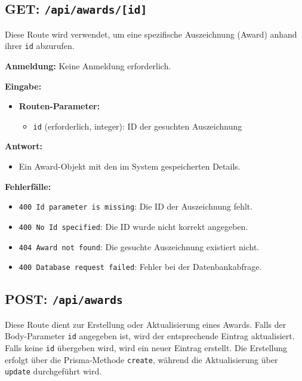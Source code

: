 \documentclass[a4paper,12pt]{article}
\begin{document}
\newpage
\subsection{GET: \texttt{/api/awards/[id]}}

Diese Route wird verwendet, um eine spezifische Auszeichnung (Award) anhand
ihrer \texttt{id} abzurufen.

\textbf{Anmeldung:} Keine Anmeldung erforderlich.

\textbf{Eingabe:}
\begin{itemize}
    \item \textbf{Routen-Parameter:}
    \begin{itemize}
        \item \texttt{id} (erforderlich, integer):
            ID der gesuchten Auszeichnung
    \end{itemize}
\end{itemize}

\textbf{Antwort:}
\begin{itemize}
    \item Ein Award-Objekt mit den im System gespeicherten Details.
\end{itemize}

\textbf{Fehlerfälle:}
\begin{itemize}
    \item \texttt{400 Id parameter is missing}:
        Die ID der Auszeichnung fehlt.
    \item \texttt{400 No Id specified}:
        Die ID wurde nicht korrekt angegeben.
    \item \texttt{404 Award not found}:
        Die gesuchte Auszeichnung existiert nicht.
    \item \texttt{400 Database request failed}:
        Fehler bei der Datenbankabfrage.
\end{itemize}

\newpage
\subsection{POST: \texttt{/api/awards}}

Diese Route dient zur Erstellung oder Aktualisierung eines Awards. Falls der
Body-Parameter \texttt{id} angegeben ist, wird der entsprechende Eintrag
aktualisiert. Falls keine \texttt{id} übergeben wird, wird ein neuer Eintrag
erstellt. Die Erstellung erfolgt über die Prisma-Methode \texttt{create},
während die Aktualisierung über \texttt{update} durchgeführt wird.
\end{document}
